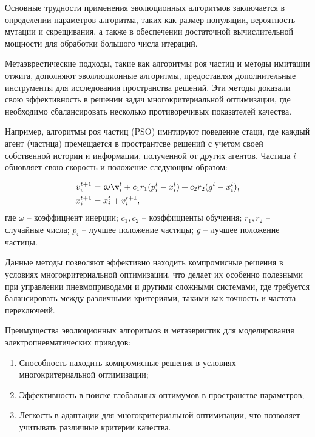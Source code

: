 Основные трудности применения эволюционных алгоритмов заключается
в определении параметров алгоритма, таких как размер популяции, вероятность мутации и
скрещивания, а также в обеспечении достаточной вычислительной мощности для
обработки большого числа итераций.

Метаэврестические подходы, такие как алгоритмы роя частиц и методы имитации отжига,
дополняют эволлюционные алгоритмы, предоставляя дополнительные инструменты для
исследования пространства решений. Эти методы доказали свою эффективность в
решении задач многокритериальной оптимизации, где необходимо сбалансировать
несколько противоречивых показателей качества.

Например, алгоритмы роя частиц (PSO) имитируют поведение стаци, где каждый
агент (частица) премещается в пространтсве решений с учетом своей собственной
истории и информации, полученной от других агентов. Частица $i$ обновляет
свою скорость и положение следующим образом:

\begin{equation*}
    \begin{aligned}
        v_i^{t+1} & = \omega \v_i^t + c_1 r_1 (p_i^t - x_i^t) + c_2 r_2 (g^t - x_i^t), \\
        x_i^{t+1} & = x_i^t + v_i^{t+1},
    \end{aligned}
\end{equation*}
где $\omega$ -- коэффициент инерции;
$c_1, c_2$ -- коэффициенты обучения;
$r_1, r_2$ -- случайные числа;
$p_i$ -- лучшее положение частицы;
$g$ -- лучшее положение частицы.

Данные методы позволяют эффективно находить компромисные решения в условиях
многокритериальной оптимизации, что делает их особенно полезными при
управлении пневмоприводами и другими сложными системами, где требуется балансировать
между различными критериями, такими как точность и частота переключеий.

Преимущества эволюционных алгоритмов и метаэвристик для моделирования электропневматических приводов:

\begin{enumerate}
    \item Способность находить компромисные решения в условиях многокритериальной оптимизации;
    \item Эффективность в поиске глобальных оптимумов в пространстве параметров;
    \item Легкость в адаптации для многокритериальной оптимизации, что позволяет учитывать
          различные критерии качества.
\end{enumerate}

